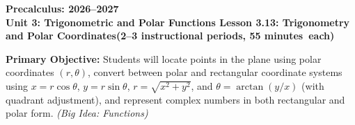 \documentclass[10pt]{article}
\newcommand{\CourseName}{Precalculus}
\newcommand{\SchoolYear}{2026--2027}
\newcommand{\MeetingLength}{55 minutes}
\newcommand{\UnitNumberName}{Unit 3: Trigonometric and Polar Functions \quad}
\newcommand{\LessonNumberName}{Lesson 3.13: Trigonometry and Polar Coordinates}
\begin{document}
\begin{center}
  {\Large\bfseries \CourseName: \SchoolYear} \\[4pt]
  {\small\bfseries \UnitNumberName \LessonNumberName \quad (2--3 instructional periods, \MeetingLength\ each)}
\end{center}

\begin{tcolorbox}[colback=sky, colframe=navy, boxrule=0.9pt, arc=2mm,
    left=2mm, right=2mm, top=1.5mm, bottom=1.5mm]
  \textbf{Primary Objective:} Students will locate points in the plane using
  polar coordinates $(r,\theta)$, convert between polar and rectangular coordinate
  systems using $x = r\cos\theta$, $y = r\sin\theta$, $r = \sqrt{x^2+y^2}$, and
  $\theta = \arctan(y/x)$ (with quadrant adjustment), and represent complex numbers
  in both rectangular and polar form.
  \textit{(Big Idea: Functions)}
\end{tcolorbox}

\vspace{0.08in}
\end{document}
